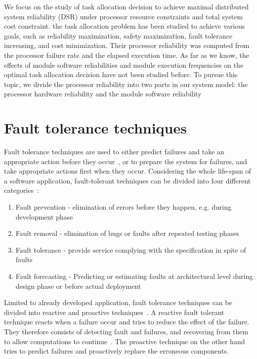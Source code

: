 \documentclass{cslthse-msc}
\begin{document}
We focus on the study of task allocation decision to achieve maximal distributed system reliability (DSR) under processor resource constraints and total system cost constraint. the task allocation problem has been studied to achieve various goals, such as reliability maximization, safety maximization, fault tolerance increasing, and cost minimization. Their processor reliability was computed from the processor failure rate and the elapsed execution time. As far as we know, the effects of module software reliabilities and module execution frequencies on the optimal task allocation decision have not been studied before. To pursue this topic, we divide the processor reliability into two parts in our system model: the processor hardware reliability and the module software reliability \cite{decisionModelTaskAllocation}
\fi

\section{Fault tolerance techniques} \label{sec:background_fault_tol_tech}
Fault tolerance techniques are used to either predict failures and take an appropriate action before they occur~\cite{faultToleranceChallenges}, or to prepare the system for failures, and take appropriate actions first when they occur. Considering the whole life-span of a software application, fault-tolerant techniques can be divided into four different categories~\cite{surveyReliabilityDistr}:

\begin{enumerate}
\item Fault prevention - elimination of errors before they happen, e.g. during development phase
\item Fault removal - elimination of bugs or faults after repeated testing phases
\item Fault tolerance - provide service complying with the specification in spite of faults
\item Fault forecasting - Predicting or estimating faults at architectural level during design phase or before actual deployment
\end{enumerate}

Limited to already developed application, fault tolerance techniques can be divided into reactive and proactive techniques~\cite{faultToleranceChallenges}. A reactive fault tolerant technique reacts when a failure occur and tries to reduce the effect of the failure. They therefore consists of detecting fault and failures, and recovering from them to allow computations to continue~\cite{relGridSystems}. The proactive technique on the other hand tries to predict failures and proactively replace the erroneous components.
\end{document}
